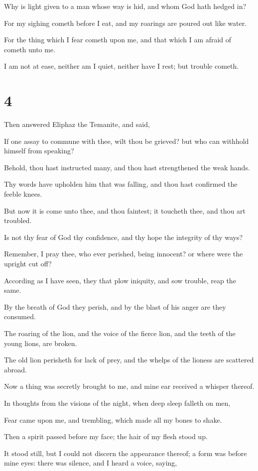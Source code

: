 \documentclass[12pt,oneside]{book}
\begin{document}
Why is light given to a man whose way is hid, and whom God hath hedged in?

For my sighing cometh before I eat, and my roarings are poured out like water.

For the thing which I fear cometh upon me, and that which I am afraid of cometh unto me.

I am not at ease, neither am I quiet, neither have I rest; but trouble cometh.

\chapter{4}
Then answered Eliphaz the Temanite, and said,

If one assay to commune with thee, wilt thou be grieved? but who can withhold himself from speaking?

Behold, thou hast instructed many, and thou hast strengthened the weak hands.

Thy words have upholden him that was falling, and thou hast confirmed the feeble knees.

But now it is come unto thee, and thou faintest; it toucheth thee, and thou art troubled.

Is not thy fear of God thy confidence, and thy hope the integrity of thy ways?

Remember, I pray thee, who ever perished, being innocent? or where were the upright cut off?

According as I have seen, they that plow iniquity, and sow trouble, reap the same.

By the breath of God they perish, and by the blast of his anger are they consumed.

The roaring of the lion, and the voice of the fierce lion, and the teeth of the young lions, are broken.

The old lion perisheth for lack of prey, and the whelps of the lioness are scattered abroad.

Now a thing was secretly brought to me, and mine ear received a whisper thereof.

In thoughts from the visions of the night, when deep sleep falleth on men,

Fear came upon me, and trembling, which made all my bones to shake.

Then a spirit passed before my face; the hair of my flesh stood up.

It stood still, but I could not discern the appearance thereof; a form was before mine eyes: there was silence, and I heard a voice, saying,
\end{document}
